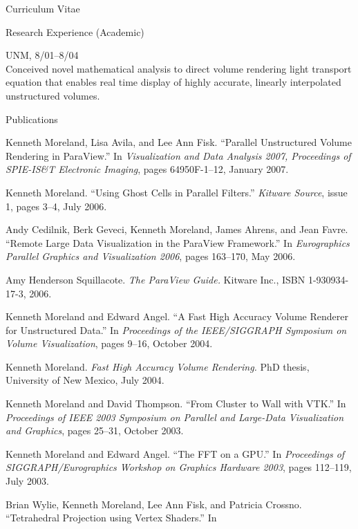 \documentclass{article}
\begin{document}
\begin{cv}{Curriculum Vitae}
    \begin{cvlist}{Research Experience (Academic)}
    \item[Doctoral Research] UNM, 8/01--8/04 \\
      Conceived novel mathematical analysis to direct volume rendering
      light transport equation that enables real time display of highly
      accurate, linearly interpolated unstructured volumes.
    \end{cvlist}

    \begin{cvlist}{Publications}
      \item Kenneth Moreland, Lisa Avila, and Lee Ann Fisk.  ``Parallel
	Unstructured Volume Rendering in ParaView.''  In
	\emph{Visualization and Data Analysis 2007, Proceedings of
	SPIE-IS\&T Electronic Imaging}, pages 64950F-1--12, January 2007.
      \item Kenneth Moreland.  ``Using Ghost Cells in Parallel Filters.''
        \emph{Kitware Source}, issue 1, pages 3--4, July 2006.
      \item Andy Cedilnik, Berk Geveci, Kenneth Moreland, James Ahrens, and
	Jean Favre.  ``Remote Large Data Visualization in the ParaView
	Framework.''  In \emph{Eurographics Parallel Graphics and
	Visualization 2006}, pages 163--170, May 2006.
      \item Amy Henderson Squillacote.  \emph{The ParaView Guide.}  Kitware
	Inc., ISBN 1-930934-17-3, 2006.
      \item Kenneth Moreland and Edward Angel.  ``A Fast High Accuracy
        Volume Renderer for Unstructured Data.''  In \emph{Proceedings of
        the IEEE/SIGGRAPH Symposium on Volume Visualization}, pages 9--16,
        October 2004.
      \item Kenneth Moreland.  \emph{Fast High Accuracy Volume Rendering.}
        PhD thesis, University of New Mexico, July 2004.
      \item Kenneth Moreland and David Thompson.  ``From Cluster to Wall
        with VTK.''  In \emph{Proceedings of IEEE 2003 Symposium on
        Parallel and Large-Data Visualization and Graphics}, pages 25--31,
        October 2003.
      \item Kenneth Moreland and Edward Angel.  ``The FFT on a GPU.''  In
	\emph{Proceedings of SIGGRAPH/Eurographics Workshop on Graphics
	Hardware 2003}, pages 112--119, July 2003.
      \item Brian Wylie, Kenneth Moreland, Lee Ann Fisk, and Patricia
	Crossno.  ``Tetrahedral Projection using Vertex Shaders.''  In

\end{cvlist}
\end{cv}
\end{document}
